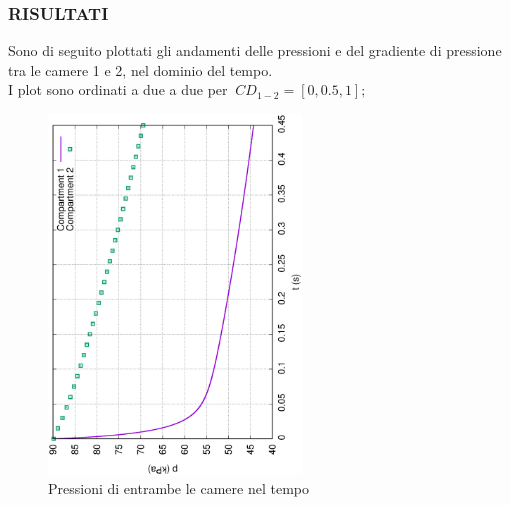 \documentclass{article}
\begin{document}
        \subsubsection{RISULTATI}
        Sono di seguito plottati gli andamenti delle pressioni e del 
        gradiente di pressione tra le camere 1 e 2, nel dominio del tempo. \\ 
        I plot sono ordinati a due a due per $\ CD_{1-2} = [0, 0.5, 1];$ \

        \begin{figure}[h!]
            \centering
            \label{fig:press_cam_0}
            \includegraphics[width=0.6\textwidth, angle=-90]{MUL2/Esercitazione1/1A/p.eps}
            \caption{Pressioni di entrambe le camere nel tempo}
        \end{figure}
\end{document}
